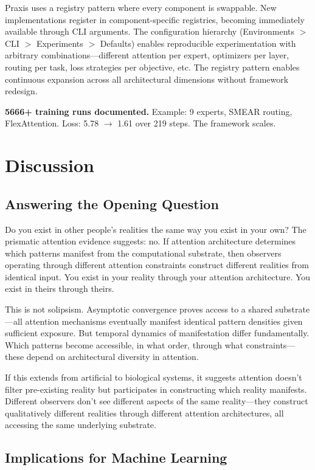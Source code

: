 \documentclass{article}
\begin{document}
Praxis uses a registry pattern where every component is swappable. New implementations register in component-specific registries, becoming immediately available through CLI arguments. The configuration hierarchy (Environments $>$ CLI $>$ Experiments $>$ Defaults) enables reproducible experimentation with arbitrary combinations—different attention per expert, optimizers per layer, routing per task, loss strategies per objective, etc. The registry pattern enables continuous expansion across all architectural dimensions without framework redesign.

\textbf{5666+ training runs documented.} Example: 9 experts, SMEAR routing, FlexAttention. Loss: 5.78 $\rightarrow$ 1.61 over 219 steps. The framework scales.

\section{Discussion}

\subsection{Answering the Opening Question}

Do you exist in other people's realities the same way you exist in your own? The prismatic attention evidence suggests: no. If attention architecture determines which patterns manifest from the computational substrate, then observers operating through different attention constraints construct different realities from identical input. You exist in your reality through your attention architecture. You exist in theirs through theirs.

This is not solipsism. Asymptotic convergence proves access to a shared substrate—all attention mechanisms eventually manifest identical pattern densities given sufficient exposure. But temporal dynamics of manifestation differ fundamentally. Which patterns become accessible, in what order, through what constraints—these depend on architectural diversity in attention.

If this extends from artificial to biological systems, it suggests attention doesn't filter pre-existing reality but participates in constructing which reality manifests. Different observers don't see different aspects of the same reality—they construct qualitatively different realities through different attention architectures, all accessing the same underlying substrate.

\subsection{Implications for Machine Learning}
\end{document}
